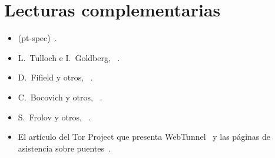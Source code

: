 \section*{Lecturas complementarias}
\begin{itemize}
  \item {} (pt-spec)~\cite{torspec}.
  \item L.~Tulloch e I.~Goldberg, ~\cite{tulloch2023lox}.
  \item D.~Fifield y otros, ~\cite{fifield2015fronting}.
  \item C.~Bocovich y otros, ~\cite{bocovich2024snowflake}.
  \item S.~Frolov y otros, ~\cite{frolov2019conjure}.
  \item El artículo del Tor Project que presenta WebTunnel~\cite{torblogwebtunnel} y las páginas de asistencia sobre puentes~\cite{torsupport}.
\end{itemize}
